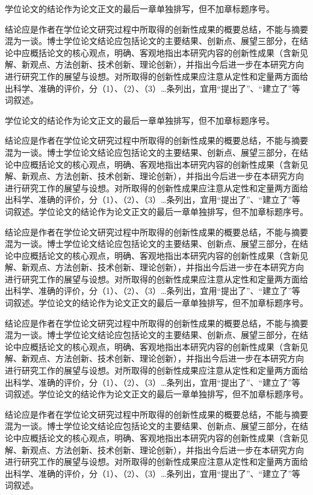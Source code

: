 \begin{conclusions}

学位论文的结论作为论文正文的最后一章单独排写，但不加章标题序号。

结论应是作者在学位论文研究过程中所取得的创新性成果的概要总结，不能与摘要混为一谈。博士学位论文结论应包括论文的主要结果、创新点、展望三部分，在结论中应概括论文的核心观点，明确、客观地指出本研究内容的创新性成果（含新见解、新观点、方法创新、技术创新、理论创新），并指出今后进一步在本研究方向进行研究工作的展望与设想。对所取得的创新性成果应注意从定性和定量两方面给出科学、准确的评价，分（1）、（2）、（3）…条列出，宜用“提出了”、“建立了”等词叙述。

学位论文的结论作为论文正文的最后一章单独排写，但不加章标题序号。

结论应是作者在学位论文研究过程中所取得的创新性成果的概要总结，不能与摘要混为一谈。博士学位论文结论应包括论文的主要结果、创新点、展望三部分，在结论中应概括论文的核心观点，明确、客观地指出本研究内容的创新性成果（含新见解、新观点、方法创新、技术创新、理论创新），并指出今后进一步在本研究方向进行研究工作的展望与设想。对所取得的创新性成果应注意从定性和定量两方面给出科学、准确的评价，分（1）、（2）、（3）…条列出，宜用“提出了”、“建立了”等词叙述。学位论文的结论作为论文正文的最后一章单独排写，但不加章标题序号。

结论应是作者在学位论文研究过程中所取得的创新性成果的概要总结，不能与摘要混为一谈。博士学位论文结论应包括论文的主要结果、创新点、展望三部分，在结论中应概括论文的核心观点，明确、客观地指出本研究内容的创新性成果（含新见解、新观点、方法创新、技术创新、理论创新），并指出今后进一步在本研究方向进行研究工作的展望与设想。对所取得的创新性成果应注意从定性和定量两方面给出科学、准确的评价，分（1）、（2）、（3）…条列出，宜用“提出了”、“建立了”等词叙述。学位论文的结论作为论文正文的最后一章单独排写，但不加章标题序号。

结论应是作者在学位论文研究过程中所取得的创新性成果的概要总结，不能与摘要混为一谈。博士学位论文结论应包括论文的主要结果、创新点、展望三部分，在结论中应概括论文的核心观点，明确、客观地指出本研究内容的创新性成果（含新见解、新观点、方法创新、技术创新、理论创新），并指出今后进一步在本研究方向进行研究工作的展望与设想。对所取得的创新性成果应注意从定性和定量两方面给出科学、准确的评价，分（1）、（2）、（3）…条列出，宜用“提出了”、“建立了”等词叙述。学位论文的结论作为论文正文的最后一章单独排写，但不加章标题序号。

结论应是作者在学位论文研究过程中所取得的创新性成果的概要总结，不能与摘要混为一谈。博士学位论文结论应包括论文的主要结果、创新点、展望三部分，在结论中应概括论文的核心观点，明确、客观地指出本研究内容的创新性成果（含新见解、新观点、方法创新、技术创新、理论创新），并指出今后进一步在本研究方向进行研究工作的展望与设想。对所取得的创新性成果应注意从定性和定量两方面给出科学、准确的评价，分（1）、（2）、（3）…条列出，宜用“提出了”、“建立了”等词叙述。

\end{conclusions}

